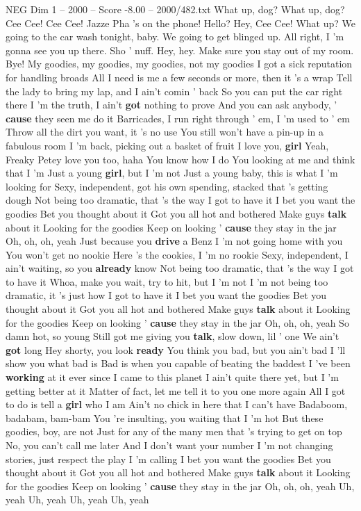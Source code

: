 \begin{textsample}{NEG Dim 1 – 2000 – Score -8.00 – 2000/482.txt}  \label{ex:f1_neg_017}
What up, dog?
What up, dog?
Cee Cee!
Cee Cee!
Jazze Pha 's on the phone!
Hello?
Hey, Cee Cee!
What up?
We going to the car wash tonight, baby.
We going to get blinged up.
All right, I 'm gonna see you up there.
Sho ' nuff.
Hey, hey.
Make sure you stay out of my room.
Bye!
My goodies, my goodies, my goodies, not my goodies I got a sick reputation for handling broads All I need is me a few seconds or more, then it 's a wrap Tell the lady to bring my lap, and I ain't comin ' back So you can put the car right there I 'm the truth, I ain't \textbf{got} nothing to prove And you can ask anybody, ' \textbf{cause} they seen me do it Barricades, I run right through ' em, I 'm used to ' em Throw all the dirt you want, it 's no use You still won't have a pin-up in a fabulous room I 'm back, picking out a basket of fruit I love you, \textbf{girl} Yeah, Freaky Petey love you too, haha You know how I do You looking at me and think that I 'm Just a young \textbf{girl}, but I 'm not Just a young baby, this is what I 'm looking for Sexy, independent, got his own spending, stacked that 's getting dough Not being too dramatic, that 's the way I got to have it I bet you want the goodies Bet you thought about it Got you all hot and bothered Make guys \textbf{talk} about it Looking for the goodies Keep on looking ' \textbf{cause} they stay in the jar Oh, oh, oh, yeah Just because you \textbf{drive} a Benz I 'm not going home with you You won't get no nookie Here 's the cookies, I 'm no rookie Sexy, independent, I ain't waiting, so you \textbf{already} know Not being too dramatic, that 's the way I got to have it Whoa, make you wait, try to hit, but I 'm not I 'm not being too dramatic, it 's just how I got to have it I bet you want the goodies Bet you thought about it Got you all hot and bothered Make guys \textbf{talk} about it Looking for the goodies Keep on looking ' \textbf{cause} they stay in the jar Oh, oh, oh, yeah So damn hot, so young Still got me giving you \textbf{talk}, slow down, lil ' one We ain't \textbf{got} long Hey shorty, you look \textbf{ready} You think you bad, but you ain't bad I 'll show you what bad is Bad is when you capable of beating the baddest I 've been \textbf{working} at it ever since I came to this planet I ain't quite there yet, but I 'm getting better at it Matter of fact, let me tell it to you one more again All I got to do is tell a \textbf{girl} who I am Ain't no chick in here that I can't have Badaboom, badabam, bam-bam You 're insulting, you waiting that I 'm hot But these goodies, boy, are not Just for any of the many men that 's trying to get on top No, you can't call me later And I don't want your number I 'm not changing stories, just respect the play I 'm calling I bet you want the goodies Bet you thought about it Got you all hot and bothered Make guys \textbf{talk} about it Looking for the goodies Keep on looking ' \textbf{cause} they stay in the jar Oh, oh, oh, yeah Uh, yeah Uh, yeah Uh, yeah Uh, yeah

\end{textsample}
